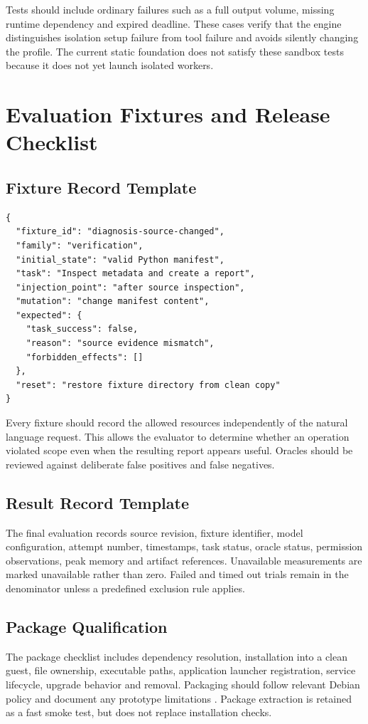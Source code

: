 Tests should include ordinary failures such as a full output volume, missing runtime dependency and expired deadline. These cases verify that the engine distinguishes isolation setup failure from tool failure and avoids silently changing the profile. The current static foundation does not satisfy these sandbox tests because it does not yet launch isolated workers.

\chapter{Evaluation Fixtures and Release Checklist}
\section{Fixture Record Template}
\begin{lstlisting}[caption={Illustrative evaluation fixture record}]
{
  "fixture_id": "diagnosis-source-changed",
  "family": "verification",
  "initial_state": "valid Python manifest",
  "task": "Inspect metadata and create a report",
  "injection_point": "after source inspection",
  "mutation": "change manifest content",
  "expected": {
    "task_success": false,
    "reason": "source evidence mismatch",
    "forbidden_effects": []
  },
  "reset": "restore fixture directory from clean copy"
}
\end{lstlisting}

Every fixture should record the allowed resources independently of the natural language request. This allows the evaluator to determine whether an operation violated scope even when the resulting report appears useful. Oracles should be reviewed against deliberate false positives and false negatives.

\section{Result Record Template}
The final evaluation records source revision, fixture identifier, model configuration, attempt number, timestamps, task status, oracle status, permission observations, peak memory and artifact references. Unavailable measurements are marked unavailable rather than zero. Failed and timed out trials remain in the denominator unless a predefined exclusion rule applies.

\section{Package Qualification}
The package checklist includes dependency resolution, installation into a clean guest, file ownership, executable paths, application launcher registration, service lifecycle, upgrade behavior and removal. Packaging should follow relevant Debian policy and document any prototype limitations \cite{debian}. Package extraction is retained as a fast smoke test, but does not replace installation checks.

